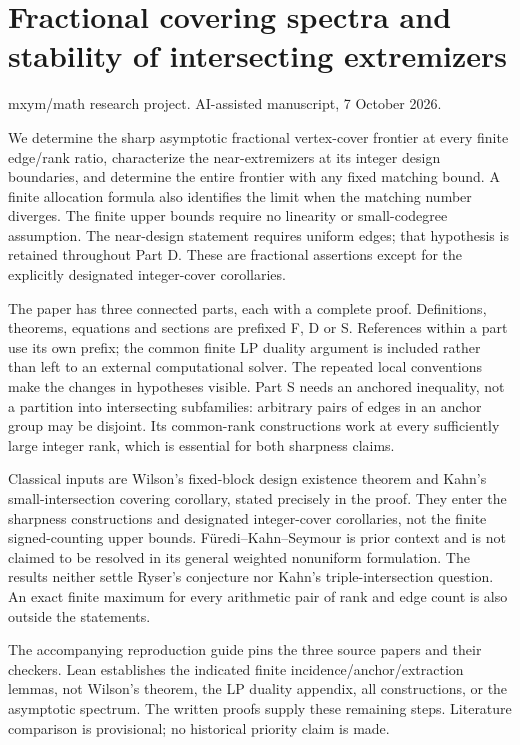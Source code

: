 \documentclass[
  11pt,
]{article}
\author{}
\date{}
\begin{document}
\section{Fractional covering spectra and stability of intersecting
extremizers}\label{fractional-covering-spectra-and-stability-of-intersecting-extremizers}

mxym/math research project. AI-assisted manuscript, 7 October 2026.

We determine the sharp asymptotic fractional vertex-cover frontier at
every finite edge/rank ratio, characterize the near-extremizers at its
integer design boundaries, and determine the entire frontier with any
fixed matching bound. A finite allocation formula also identifies the
limit when the matching number diverges. The finite upper bounds require
no linearity or small-codegree assumption. The near-design statement
requires uniform edges; that hypothesis is retained throughout Part D.
These are fractional assertions except for the explicitly designated
integer-cover corollaries.

The paper has three connected parts, each with a complete proof.
Definitions, theorems, equations and sections are prefixed F, D or S.
References within a part use its own prefix; the common finite LP
duality argument is included rather than left to an external
computational solver. The repeated local conventions make the changes in
hypotheses visible. Part S needs an anchored inequality, not a partition
into intersecting subfamilies: arbitrary pairs of edges in an anchor
group may be disjoint. Its common-rank constructions work at every
sufficiently large integer rank, which is essential for both sharpness
claims.

Classical inputs are Wilson's fixed-block design existence theorem and
Kahn's small-intersection covering corollary, stated precisely in the
proof. They enter the sharpness constructions and designated
integer-cover corollaries, not the finite signed-counting upper bounds.
Füredi--Kahn--Seymour is prior context and is not claimed to be resolved
in its general weighted nonuniform formulation. The results neither
settle Ryser's conjecture nor Kahn's triple-intersection question. An
exact finite maximum for every arithmetic pair of rank and edge count is
also outside the statements.

The accompanying reproduction guide pins the three source papers and
their checkers. Lean establishes the indicated finite
incidence/anchor/extraction lemmas, not Wilson's theorem, the LP duality
appendix, all constructions, or the asymptotic spectrum. The written
proofs supply these remaining steps. Literature comparison is
provisional; no historical priority claim is made.
\end{document}
